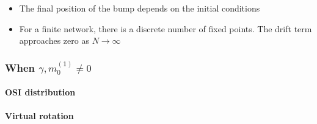 \begin{itemize}
  \item The final position of the bump depends on the initial conditions
  \item For a finite network, there is a discrete number of fixed points. The drift term approaches zero as $N \rightarrow \infty$
\end{itemize}



\subsubsection{When  $\gamma, m_0^{(1)} \neq 0$} 

\paragraph{OSI distribution}


\paragraph{Virtual rotation}




